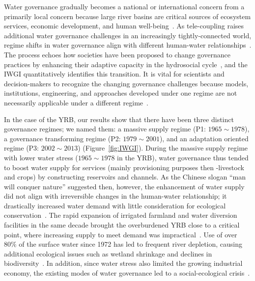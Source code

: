 
Water governance gradually becomes a national or international concern from a primarily local concern because large river basins are critical sources of ecosystem services, economic development, and human well-being~\cite{best2019,best2020}.
As tele-coupling raises additional water governance challenges in an increasingly tightly-connected world, regime shifts in water governance align with different human-water relationships~\cite{diaz2019}.
The process echoes how societies have been proposed to change governance practices by enhancing their adaptive capacity in the hydrosocial cycle~\cite{loch2020,turton1999}, and the IWGI quantitatively identifies this transition.
It is vital for scientists and decision-makers to recognize the changing governance challenges because models, institutions, engineering, and approaches developed under one regime are not necessarily applicable under a different regime~\cite{reyers2018}.

In the case of the YRB, our results show that there have been three distinct governance regimes; we named them: a massive supply regime (P1: $1965 \sim 1978$), a governance transforming regime (P2: $1979 \sim 2001$), and an adaptation oriented regime (P3: $2002 \sim 2013$) (Figure~\ref{fig:IWGI}).
During the massive supply regime with lower water stress ($1965 \sim 1978$ in the YRB), water governance thus tended to boost water supply for services (mainly provisioning purposes then -livestock and crops) by constructing reservoirs and channels.
As the Chinese slogan ``man will conquer nature'' suggested then, however, the enhancement of water supply did not align with irreversible changes in the human-water relationship; it drastically increased water demand with little consideration for ecological conservation~\cite{zhou2020}.
The rapid expansion of irrigated farmland and water diversion facilities in the same decade brought the overburdened YRB close to a critical point, where increasing supply to meet demand was impractical~\cite{loch2020}.
Use of over $80\%$ of the surface water since 1972 has led to frequent river depletion, causing additional ecological issues such as wetland shrinkage and declines in biodiversity~\cite{wang2019c}.
In addition, since water stress also limited the growing industrial economy, the existing modes of water governance led to a social-ecological crisis~\cite{wohlfart2016}.

